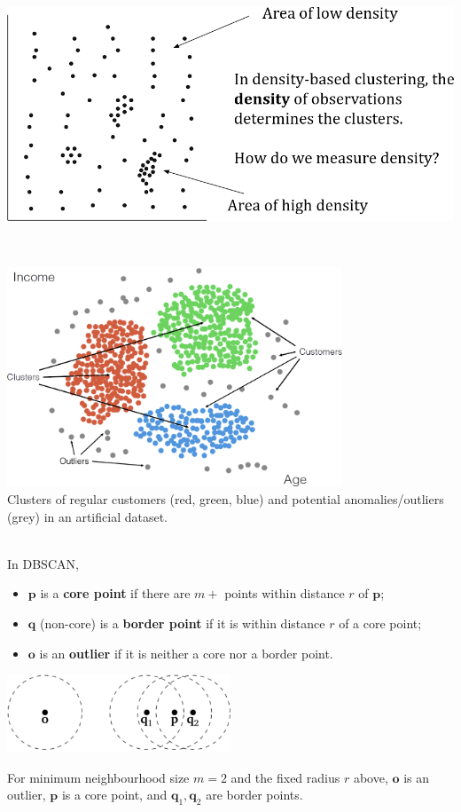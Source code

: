 \documentclass[20pt,landscape,footrule,headrule]{foils}
\begin{document}
{{\newpage\ \\ 
\begin{center}
\includegraphics[width=\textwidth]{Images/Clustering1}
\end{center}

\newpage\ 
\begin{center}
\includegraphics[width=0.75\textwidth]{Images/clustering2_EN.png} \\ 
Clusters of regular customers (red, green, blue) and potential anomalies/outliers (grey) in an artificial dataset.
\end{center}
\newpage\ \\ \noindent In DBSCAN, 
\begin{itemize} 
\item $\mathbf{p}$ is a \textbf{core point} if there are $m+$ points within distance $r$ of $\mathbf{p}$;
\item $\mathbf{q}$ (non-core) is a \textbf{border point} if it is within distance $r$ of a core point; 
\item $\mathbf{o}$ is an \textbf{outlier} if it is neither a core nor a border point.
\end{itemize}

\begin{center}\includegraphics[width=0.5\textwidth]{Images/Figure13}
\end{center}
{For minimum neighbourhood size $m=2$ and the fixed radius $r$ above, $\mathbf{o}$ is an outlier, $\mathbf{p}$ is a core point, and $\mathbf{q}_1,\mathbf{q}_2$ are border points.}

}}
\end{document}
